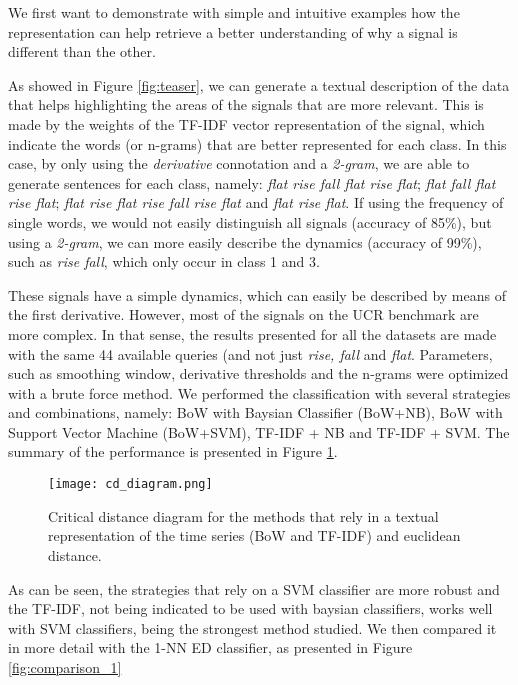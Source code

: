{We first want to demonstrate with simple and intuitive examples how the representation can help retrieve a better understanding of why a signal is different than the other.
\par
As showed in Figure \ref{fig:teaser}, we can generate a textual description of the data that helps highlighting the areas of the signals that are more relevant. This is made by the weights of the TF-IDF vector representation of the signal, which indicate the words (or n-grams) that are better represented for each class. In this case, by only using the \textit{derivative} connotation and a \textit{2-gram}, we are able to generate sentences for each class, namely: \textit{flat rise fall flat rise flat}; \textit{flat fall flat rise flat}; \textit{flat rise flat rise fall rise flat} and \textit{flat rise flat}. If using the frequency of single words, we would not easily distinguish all signals (accuracy of 85\%), but using a \textit{2-gram}, we can more easily describe the dynamics (accuracy of 99\%), such as \textit{rise fall}, which only occur in class 1 and 3. 
\par
These signals have a simple dynamics, which can easily be described by means of the first derivative. However, most of the signals on the UCR benchmark are more complex. In that sense, the results presented for all the datasets are made with the same 44 available queries (and not just \textit{rise, fall} and \textit{flat}. Parameters, such as smoothing window, derivative thresholds and the n-grams were optimized with a brute force method. We performed the classification with several strategies and combinations, namely: BoW with Baysian Classifier (BoW+NB), BoW with Support Vector Machine (BoW+SVM), TF-IDF + NB and TF-IDF + SVM. The summary of the performance is presented in Figure \ref{fig:cd_diagram}.
\begin{figure}
    \centering
    \texttt{[image: cd\_diagram.png]}
    \caption{Critical distance diagram for the methods that rely in a textual representation of the time series (BoW and TF-IDF) and euclidean distance.}
    \label{fig:cd_diagram}
\end{figure}

As can be seen, the strategies that rely on a SVM classifier are more robust and the TF-IDF, not being indicated to be used with baysian classifiers, works well with SVM classifiers, being the strongest method studied. We then compared it in more detail with the 1-NN ED classifier, as presented in Figure \ref{fig:comparison_1}

}
